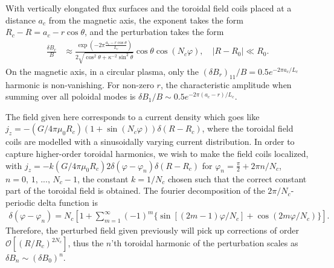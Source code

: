 \documentclass[11pt,a4paper]{article}
\newcommand{\Ordo}{\ensuremath{\mathcal{O}}}%
\begin{document}
With vertically elongated flux surfaces and the toroidal field coils placed at a distance $a_c$ from the magnetic axis, the exponent takes the form $R_c-R = a_c - r\cos\theta$, and the perturbation takes the form
\begin{align}
\frac{\delta B_r}{B} &\approx \frac{\exp\left(- 2\pi\frac{a_c - r\cos\theta}{L_c} \right)}{2\sqrt{\cos^2\theta + \kappa^{-2}\sin^2\theta}} \cos\theta \cos(N_c\varphi) , \quad |R-R_0| \ll R_0.
\end{align}
On the magnetic axis, in a circular plasma, only the $(\delta B_r)_{11}/B = 0.5 e^{-2\pi a_c/L_c}$ harmonic is non-vanishing. For non-zero $r$, the characteristic amplitude when summing over all poloidal modes is $\delta B_1/B \sim 0.5 e^{-2\pi(a_c-r)/L_c}$.

The field given here corresponds to a current density which goes like $j_z = -(G/4\pi \mu_0 R_c)(1+\sin(N_c\varphi))\delta(R-R_c)$, where the toroidal field coils are modelled with a sinusoidally varying current distribution. In order to capture higher-order toroidal harmonics, we wish to make the field coils localized, with $j_z = -k(G/4\pi \mu_0 R_c) 2\delta(\varphi - \varphi_n)\delta(R-R_c)$ for $\varphi_n = \frac{\pi}{2}+ 2\pi n/N_c$, $n=0,\,1,\,...,\,N_c-1$, the constant $k=1/N_c$ chosen such that the correct constant part of the toroidal field is obtained. The fourier decomposition of the $2\pi/N_c$-periodic delta function is
\begin{align}
\delta(\varphi-\varphi_n) = N_c\left[ 1 + \sum_{m=1}^\infty (-1)^m\{\sin[ (2m-1) \varphi/N_c] + \cos( 2m\varphi/N_c)\} \right].
\end{align}
Therefore, the perturbed field given previously will pick up corrections of order $\Ordo[(R/R_c)^{2N_c}]$, thus the $n$'th toroidal harmonic of the perturbation scales as $\delta B_n \sim (\delta B_0)^n$.
\end{document}
